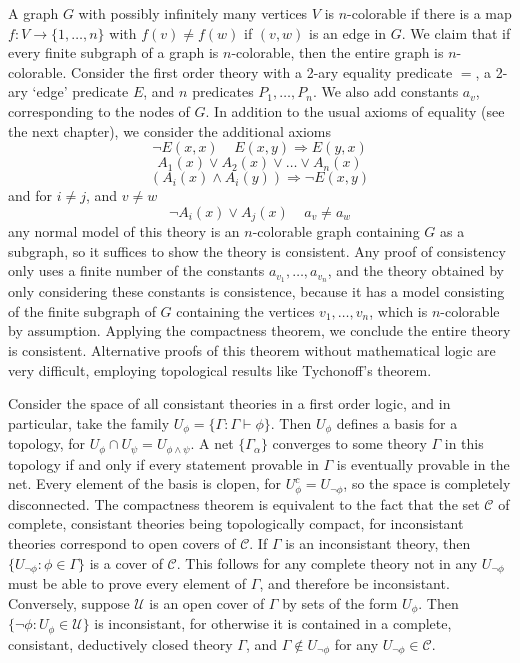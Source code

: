 \begin{example}
    A graph $G$ with possibly infinitely many vertices $V$ is $n$-colorable if there is a map $f: V \to \{ 1, \dots, n \}$ with $f(v) \neq f(w)$ if $(v,w)$ is an edge in $G$. We claim that if every finite subgraph of a graph is $n$-colorable, then the entire graph is $n$-colorable. Consider the first order theory with a 2-ary equality predicate $=$, a 2-ary `edge' predicate $E$, and $n$ predicates $P_1, \dots, P_n$. We also add constants $a_v$, corresponding to the nodes of $G$. In addition to the usual axioms of equality (see the next chapter), we consider the additional axioms
    \[ \neg E(x,x)\ \ \ \ \ E(x,y) \Rightarrow E(y,x) \]
    \[ A_1(x) \vee A_2(x) \vee \dots \vee A_n(x) \]
    \[ \left( A_i(x) \wedge A_i(y) \right) \Rightarrow \neg E(x,y) \]
    and for $i \neq j$, and $v \neq w$
    \[ \neg A_i(x) \vee A_j(x)\ \ \ \ \ a_v \neq a_w \]
    any normal model of this theory is an $n$-colorable graph containing $G$ as a subgraph, so it suffices to show the theory is consistent. Any proof of consistency only uses a finite number of the constants $a_{v_1}, \dots, a_{v_n}$, and the theory obtained by only considering these constants is consistence, because it has a model consisting of the finite subgraph of $G$ containing the vertices $v_1, \dots, v_n$, which is $n$-colorable by assumption. Applying the compactness theorem, we conclude the entire theory is consistent. Alternative proofs of this theorem without mathematical logic are very difficult, employing topological results like Tychonoff's theorem.
\end{example}

Consider the space of all consistant theories in a first order logic, and in particular, take the family $U_\phi = \{ \Gamma : \Gamma \vdash \phi \}$. Then $U_\phi$ defines a basis for a topology, for $U_\phi \cap U_\psi = U_{\phi \wedge \psi}$. A net $\{ \Gamma_\alpha \}$ converges to some theory $\Gamma$ in this topology if and only if every statement provable in $\Gamma$ is eventually provable in the net. Every element of the basis is clopen, for $U_\phi^c = U_{\neg \phi}$, so the space is completely disconnected. The compactness theorem is equivalent to the fact that the set $\mathcal{C}$ of complete, consistant theories being topologically compact, for inconsistant theories correspond to open covers of $\mathcal{C}$. If $\Gamma$ is an inconsistant theory, then $\{ U_{\neg \phi} : \phi \in \Gamma \}$ is a cover of $\mathcal{C}$. This follows for any complete theory not in any $U_{\neg \phi}$ must be able to prove every element of $\Gamma$, and therefore be inconsistant. Conversely, suppose $\mathcal{U}$ is an open cover of $\Gamma$ by sets of the form $U_\phi$. Then $\{ \neg \phi : U_\phi \in \mathcal{U} \}$ is inconsistant, for otherwise it is contained in a complete, consistant, deductively closed theory $\Gamma$, and $\Gamma \not \in U_{\neg \phi}$ for any $U_{\neg \phi} \in \mathcal{C}$.

